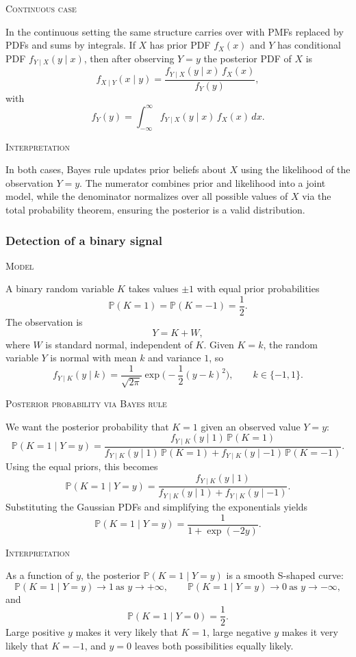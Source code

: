 \textsc{Continuous case}

In the continuous setting the same structure carries over with PMFs replaced by PDFs and sums by integrals.  
If \(X\) has prior PDF \(f_X(x)\) and \(Y\) has conditional PDF \(f_{Y\mid X}(y\mid x)\), then after observing \(Y=y\) the posterior PDF of \(X\) is
\[
f_{X\mid Y}(x\mid y)
=
\frac{f_{Y\mid X}(y\mid x)\,f_X(x)}{f_Y(y)},
\]
with
\[
f_Y(y)
=
\int_{-\infty}^{\infty} f_{Y\mid X}(y\mid x)\,f_X(x)\,dx.
\]

\textsc{Interpretation}

In both cases, Bayes rule updates prior beliefs about \(X\) using the likelihood of the observation \(Y=y\).  
The numerator combines prior and likelihood into a joint model, while the denominator normalizes over all possible values of \(X\) via the total probability theorem, ensuring the posterior is a valid distribution.


\subsubsection{Detection of a binary signal}

\textsc{Model}

A binary random variable \(K\) takes values \(\pm 1\) with equal prior probabilities
\[
\mathbb{P}(K=1)=\mathbb{P}(K=-1)=\frac{1}{2}.
\]
The observation is
\[
Y = K + W,
\]
where \(W\) is standard normal, independent of \(K\).  
Given \(K=k\), the random variable \(Y\) is normal with mean \(k\) and variance \(1\), so
\[
f_{Y\mid K}(y\mid k)
=
\frac{1}{\sqrt{2\pi}}
\exp\!\Big(-\frac{1}{2}(y-k)^{2}\Big),
\qquad k\in\{-1,1\}.
\]

\textsc{Posterior probability via Bayes rule}

We want the posterior probability that \(K=1\) given an observed value \(Y=y\):
\[
\mathbb{P}(K=1\mid Y=y)
=
\frac{f_{Y\mid K}(y\mid 1)\,\mathbb{P}(K=1)}
{f_{Y\mid K}(y\mid 1)\,\mathbb{P}(K=1)
+
f_{Y\mid K}(y\mid -1)\,\mathbb{P}(K=-1)}.
\]
Using the equal priors, this becomes
\[
\mathbb{P}(K=1\mid Y=y)
=
\frac{f_{Y\mid K}(y\mid 1)}
{f_{Y\mid K}(y\mid 1)+f_{Y\mid K}(y\mid -1)}.
\]
Substituting the Gaussian PDFs and simplifying the exponentials yields
\[
\mathbb{P}(K=1\mid Y=y)
=
\frac{1}{1+\exp(-2y)}.
\]

\textsc{Interpretation}

As a function of \(y\), the posterior \(\mathbb{P}(K=1\mid Y=y)\) is a smooth S-shaped curve:
\[
\mathbb{P}(K=1\mid Y=y)\to 1 \ \text{as }y\to+\infty,\qquad
\mathbb{P}(K=1\mid Y=y)\to 0 \ \text{as }y\to-\infty,
\]
and
\[
\mathbb{P}(K=1\mid Y=0)=\frac{1}{2}.
\]
Large positive \(y\) makes it very likely that \(K=1\), large negative \(y\) makes it very likely that \(K=-1\), and \(y=0\) leaves both possibilities equally likely.


